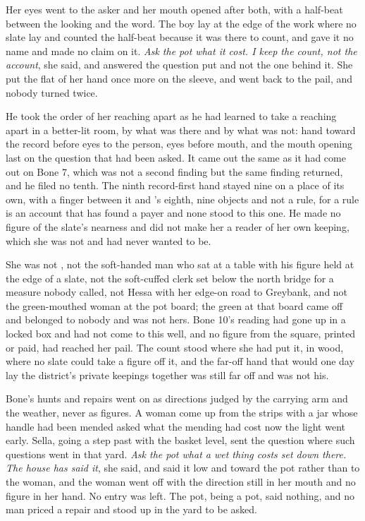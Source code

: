 Her eyes went to the asker and her mouth opened after both, with a half-beat between the looking and the word. The boy lay at the edge of the work where no slate lay and counted the half-beat because it was there to count, and gave it no name and made no claim on it. \emph{Ask the pot what it cost. I keep the count, not the account}, she said, and answered the question put and not the one behind it. She put the flat of her hand once more on the sleeve, and went back to the pail, and nobody turned twice.

He took the order of her reaching apart as he had learned to take a reaching apart in a better-lit room, by what was there and by what was not: hand toward the record before eyes to the person, eyes before mouth, and the mouth opening last on the question that had been asked. It came out the same as it had come out on Bone 7, which was not a second finding but the same finding returned, and he filed no tenth. The ninth record-first hand stayed nine on a place of its own, with a finger between it and 's eighth, nine objects and not a rule, for a rule is an account that has found a payer and none stood to this one. He made no figure of the slate's nearness and did not make her a reader of her own keeping, which she was not and had never wanted to be.

She was not , not the soft-handed man who sat at a table with his figure held at the edge of a slate, not the soft-cuffed clerk set below the north bridge for a measure nobody called, not Hessa with her edge-on road to Greybank, and not the green-mouthed woman at the pot board; the green at that board came off  and belonged to nobody and was not hers. Bone 10's reading had gone up  in a locked box and had not come to this well, and no figure from the square, printed or paid, had reached her pail. The count stood where she had put it, in wood, where no slate could take a figure off it, and the far-off hand that would one day lay the district's private keepings together was still far off and was not his.

\scenebreak

Bone's hunts and repairs went on as directions judged by the carrying arm and the weather, never as figures. A woman come up from the strips with a jar whose handle had been mended asked what the mending had cost now the light went early. Sella, going a step past with the basket level, sent the question where such questions went in that yard. \emph{Ask the pot what a wet thing costs set down there. The house has said it}, she said, and said it low and toward the pot rather than to the woman, and the woman went off with the direction still in her mouth and no figure in her hand. No entry was left. The pot, being a pot, said nothing, and no man priced a repair and stood up in the yard to be asked.

